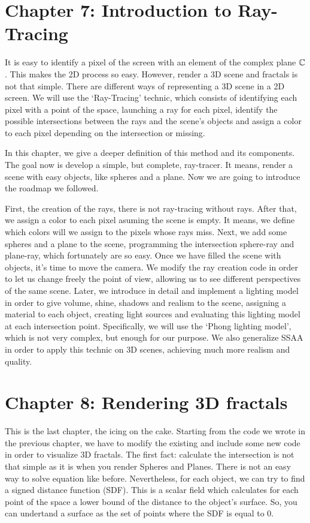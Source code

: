 \section*{Chapter 7: Introduction to Ray-Tracing}

It is easy to identify a pixel of the screen with an element of the complex plane $\mathbb{C}$. This makes the 2D process so easy. However, render a 3D scene and fractals is not that simple. There are different ways of representing a 3D scene in a 2D screen. We will use the `Ray-Tracing' technic, which consists of identifying each pixel with a point of the space, launching a ray for each pixel, identify the possible intersections between the rays and the scene's objects and assign a color to each pixel depending on the intersection or missing.

In this chapter, we give a deeper definition of this method and its components. The goal now is develop a simple, but complete, ray-tracer. It means, render a scene with easy objects, like spheres and a plane. Now we are going to introduce the roadmap we followed.

First, the creation of the rays, there is not ray-tracing without rays. After that, we assign a color to each pixel asuming the scene is empty. It means, we define which colors will we assign to the pixels whose rays miss. Next, we add some spheres and a plane to the scene, programming the intersection sphere-ray and plane-ray, which fortunately are so easy. Once we have filled the scene with objects, it's time to move the camera. We modify the ray creation code in order to let us change freely the point of view, allowing us to see different perspectives of the same scene. Later, we introduce in detail and implement a lighting model in order to give volume, shine, shadows and realism to the scene, assigning a material to each object, creating light sources and evaluating this lighting model at each intersection point. Specifically, we will use the `Phong lighting model', which is not very complex, but enough for our purpose. We also generalize SSAA in order to apply this technic on 3D scenes, achieving much more realism and quality.

\section*{Chapter 8: Rendering 3D fractals}

This is the last chapter, the icing on the cake. Starting from the code we wrote in the previous chapter, we have to modify the existing and include some new code in order to visualize 3D fractals. The first fact: calculate the intersection is not that simple as it is when you render Spheres and Planes. There is not an easy way to solve equation like before. Nevertheless, for each object, we can try to find a signed distance function (SDF). This is a scalar field which calculates for each point of the space a lower bound of the distance to the object's surface. So, you can undertand a surface as the set of points where the SDF is equal to 0.

